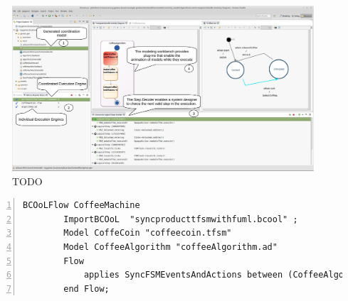 \begin{figure}
	\begin{center}
		\includegraphics[width=.8\textwidth]{bcool/figs/runningworkbench}
		\caption{TODO}
		\label{fig:runningworkbench}
	\end{center}
\end{figure}

	
	\begin{lstlisting}[language=bflow,
	caption={\bflow specification for the models of the coffee machine},
	label={lst:bflowcoffeemachine}, 
	basicstyle=\scriptsize\ttfamily, backgroundcolor=\color{LGrey}, numbers=left, xleftmargin=2pt]
	BCOoLFlow CoffeeMachine
		ImportBCOoL  "syncproducttfsmwithfuml.bcool" ;
		Model CoffeCoin "coffeecoin.tfsm"
		Model CoffeeAlgorithm "coffeeAlgorithm.ad"
		Flow 
			applies SyncFSMEventsAndActions between (CoffeeAlgorithm, CoffeCoin);
		end Flow;
	\end{lstlisting}	
	
	



